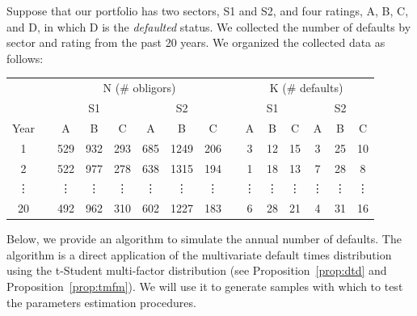 \documentclass[11pt,fleqn]{book} %
\begin{document}
\begin{example}
	Suppose that our portfolio has two sectors, S1 and S2, and four ratings, 
	A, B, C, and D, in which D is the \emph{defaulted} status. We collected 
	the number of defaults by sector and rating from the past 20 years. We 
	organized the collected data as follows:

	\centering
	\begin{tabular}{cc|c|c|c||c|c|c|  c  |c|c|c||c|c|c|}
		\cline{3-8} \cline{10-15}
		& & \multicolumn{6}{|c|}{N (\# obligors)} & & \multicolumn{6}{|c|}{K (\# defaults)} \\
		\cline{3-8} \cline{10-15}
		& & \multicolumn{3}{|c||}{S1} & \multicolumn{3}{|c|}{S2} & & \multicolumn{3}{|c||}{S1} & \multicolumn{3}{|c|}{S2} \\
		\cline{1-1} \cline{3-8} \cline{10-15}
		\multicolumn{1}{|c|}{Year} & & A & B & C & A & B & C & & A & B & C & A & B & C \\
		\cline{1-1} \cline{3-8} \cline{10-15}
		\multicolumn{1}{|c|}{1} & & 529 & 932 & 293 & 685 & 1249 & 206 & & 3 & 12 & 15 & 3 & 25 & 10 \\
		\cline{1-1} \cline{3-8} \cline{10-15}
		\multicolumn{1}{|c|}{2} & & 522 & 977 & 278 & 638 & 1315 & 194 & & 1 & 18 & 13 & 7 & 28 & 8 \\
		\cline{1-1} \cline{3-8} \cline{10-15}
		\multicolumn{1}{|c|}{\vdots} & & \vdots & \vdots & \vdots & \vdots & \vdots & \vdots & & \vdots & \vdots & \vdots & \vdots & \vdots & \vdots \\
		\cline{1-1} \cline{3-8} \cline{10-15}
		\multicolumn{1}{|c|}{20} & & 492 & 962 & 310 & 602 & 1227 & 183 & & 6 & 28 & 21 & 4 & 31 & 16 \\
		\cline{1-1} \cline{3-8} \cline{10-15}
	\end{tabular}
\end{example}

Below, we provide an algorithm to simulate the annual number of defaults. The 
algorithm is a direct application of the multivariate default times distribution
using the t-Student multi-factor distribution (see Proposition~\ref{prop:dtd} 
and Proposition~\ref{prop:tmfm}). We will use it to generate samples with which 
to test the parameters estimation procedures. 
\end{document}
